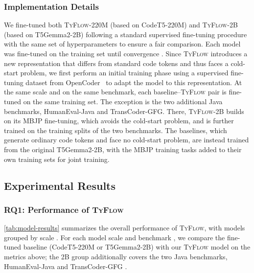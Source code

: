 \documentclass[manuscript,screen]{acmart}
\newcommand{\toolname}[1]{\textsc{#1}}
\newcommand{\mainname}{\toolname{TyFlow}\xspace}
\begin{document}
\subsubsection{Implementation Details}

We fine-tuned both \mainname-220M (based on CodeT5-220M) and \mainname-2B (based on T5Gemma2-2B) following a standard  {\color{revblue}supervised fine-tuning } procedure with the same set of hyperparameters to ensure a fair comparison. Each model was fine-tuned on the training set until convergence   {\color{revblue}.
} Since \mainname introduces a new representation that differs from standard code tokens    {\color{revblue}and thus faces a cold-start problem, we first } perform an initial    {\color{revblue}training } phase using a supervised fine-tuning dataset from OpenCoder~\cite{DBLP:journals/corr/abs-2411-04905} to    {\color{revblue}adapt the model } to this representation.
 {\color{revblue}At the same scale and on the same benchmark, each baseline--}\mainname{} {\color{revblue}pair is fine-tuned on the same training set. The exception is the two additional Java benchmarks, HumanEval-Java and TransCoder-GFG. There, }\mainname{\color{revblue}-2B builds on its MBJP fine-tuning, which avoids the cold-start problem, and is further trained on the training splits of the two benchmarks. The baselines, which generate ordinary code tokens and face no cold-start problem, are instead trained from the original T5Gemma2-2B, with the MBJP training tasks added to their own training sets for joint training.
} 

\subsection{Experimental Results}

\subsubsection{RQ1: Performance of \mainname}
\autoref{tab:model-results} summarizes the overall performance of \mainname {\color{revblue}, with models grouped by scale} .
  For each    {\color{revblue}model scale and benchmark} , we compare the    {\color{revblue}fine-tuned baseline } (CodeT5-220M    {\color{revblue}or } T5Gemma2-2B) with  %
  {\color{revblue}our }\mainname{} {\color{revblue}model on the metrics above; the 2B group additionally covers the two Java benchmarks, HumanEval-Java and TransCoder-GFG} .
\end{document}
